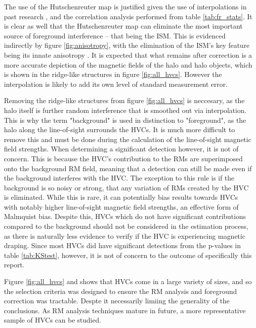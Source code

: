 The use of the Hutschenreuter map is justified given the use of interpolations in past research \citep{ID3, ID5, ID6, ID26, ID73}, and the correlation analysis performed from table \ref{tab:fr_stats}. It is clear as well that the Hutschenreuter map can eliminate the most important source of foreground interference – that being the ISM. This is evidenced indirectly by figure \ref{fig:anisotropy}, with the elimination of the ISM's key feature being its innate anisotropy \citep{ID30}. It is expected that what remains after correction is a more accurate depiction of the magnetic fields of the halo and halo objects, which is shown in the ridge-like structures in figure \ref{fig:all_hvcs}. However the interpolation is likely to add its own level of standard measurement error.


Removing the ridge-like structures from figure \ref{fig:all_hvcs} is neccesary, as the halo itself is further random interference that is smoothed out via interpolation. This is why the term "background" is used in distinction to "foreground", as the halo along the line-of-sight surrounds the HVCs. It is much more difficult to remove this and must be done during the calculation of the line-of-sight magnetic field strengths. When determining a significant detection however, it is not of concern. This is because the HVC's contribution to the RMs are superimposed onto the background RM field, meaning that a detection can still be made even if the background interferes with the HVC. The exception to this rule is if the background is so noisy or strong, that any variation of RMs created by the HVC is eliminated. While this is rare, it can potentially bias results towards HVCs with notably higher line-of-sight magnetic field strengths, an effective form of Malmquist bias. Despite this, HVCs which do not have significant contributions compared to the background should not be considered in the estimation process, as there is naturally less evidence to verify if the HVC is experiencing magnetic draping. Since most HVCs did have significant detections from the p-values in table \ref{tab:KStest}, however, it is not of concern to the outcome of specifically this report.


Figure \ref{fig:all_hvcs} and \cite{ID3} shows that HVCs come in a large variety of sizes, and so the selection criteria was designed to ensure the RM analysis and foreground correction was tractable. Despte it necessarily limiing the generality of the conclusions. As RM analysis techniques mature in future, a more representative sample of HVCs can be studied.


